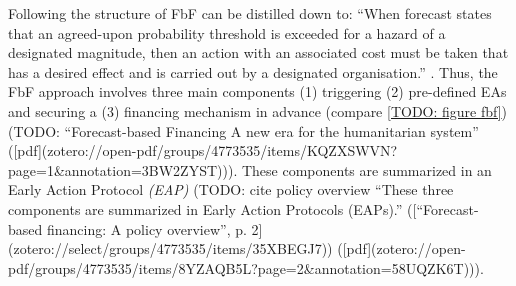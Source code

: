 
Following \autocite{coughlandeperezForecastbasedFinancingApproach2015, coughlandeperezActionbasedFloodForecasting2016} the structure of FbF can be distilled down to:
    “When forecast states that an agreed-upon probability threshold is exceeded for a hazard of a designated magnitude, then an action with an associated cost must be taken that has a desired effect and is carried out by a designated organisation.” \autocite[2]{coughlandeperezActionbasedFloodForecasting2016}.
Thus, the FbF approach involves three main components (1) triggering (2) pre-defined EAs and securing a (3) financing mechanism in advance (compare \ref{TODO: figure fbf}) (TODO: “Forecast-based Financing A new era for the humanitarian system” ([pdf](zotero://open-pdf/groups/4773535/items/KQZXSWVN?page=1&annotation=3BW2ZYST))). These components are summarized in an Early Action Protocol \textit{(EAP)} (TODO: cite policy overview “These three components are summarized in Early Action Protocols (EAPs).” ([“Forecast-based financing: A policy overview”, p. 2](zotero://select/groups/4773535/items/35XBEGJ7)) ([pdf](zotero://open-pdf/groups/4773535/items/8YZAQB5L?page=2&annotation=58UQZK6T))). 

